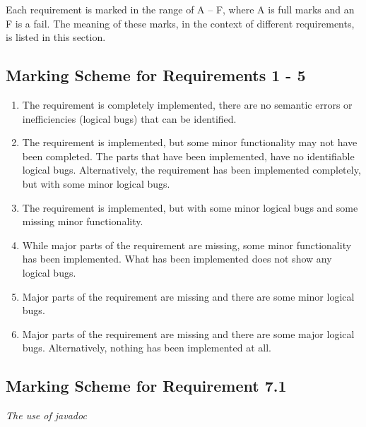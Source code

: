 \documentclass[11pt]{article}
\begin{document}
Each requirement is marked in the range of A -- F, where A is full marks and an F is a fail. The meaning of these marks, in the context of different requirements, is listed in this section.

\subsection{Marking Scheme for Requirements 1 - 5}

\begin{enumerate}[label=(\Alph*)]

	\item The requirement is completely implemented, there are no semantic errors or inefficiencies (logical bugs) that can be identified.

	\item The requirement is implemented, but some minor functionality may not have been completed. The parts that have been implemented, have no identifiable logical bugs. Alternatively,
the requirement has been implemented completely, but with some minor logical bugs.
	
	\item The requirement is implemented, but with some minor logical bugs and some missing minor
functionality.
	
	\item While major parts of the requirement are missing, some minor functionality has been
implemented. What has been implemented does not show any logical bugs.
	
	\item Major parts of the requirement are missing and there are some minor logical bugs.
	
	\item Major parts of the requirement are missing and there are some major logical bugs. Alternatively,
nothing has been implemented at all.

\end{enumerate}

\subsection{Marking Scheme for Requirement 7.1}

\emph{The use of javadoc}
\end{document}
